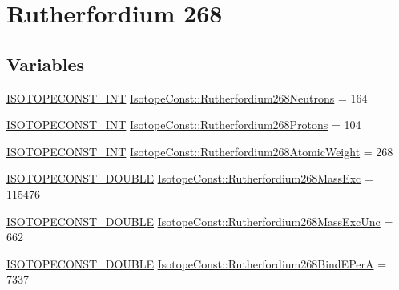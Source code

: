 \hypertarget{group___isotope_const-_rutherfordium-_rf268}{}\section{Rutherfordium 268}
\label{group___isotope_const-_rutherfordium-_rf268}
\subsection*{Variables}
\begin{DoxyCompactItemize}
\item 
\mbox{\hyperlink{group___isotope_const-_macros_ga5f18360b3e99483a35c32d789e62621c}{I\+S\+O\+T\+O\+P\+E\+C\+O\+N\+S\+T\+\_\+\+I\+NT}} \mbox{\hyperlink{group___isotope_const-_rutherfordium-_rf268_ga822ce4496854f3bbef0099f1af3bed20}{Isotope\+Const\+::\+Rutherfordium268\+Neutrons}} = 164
\item 
\mbox{\hyperlink{group___isotope_const-_macros_ga5f18360b3e99483a35c32d789e62621c}{I\+S\+O\+T\+O\+P\+E\+C\+O\+N\+S\+T\+\_\+\+I\+NT}} \mbox{\hyperlink{group___isotope_const-_rutherfordium-_rf268_ga9537b88927aee7d21b39dadd3f8a1919}{Isotope\+Const\+::\+Rutherfordium268\+Protons}} = 104
\item 
\mbox{\hyperlink{group___isotope_const-_macros_ga5f18360b3e99483a35c32d789e62621c}{I\+S\+O\+T\+O\+P\+E\+C\+O\+N\+S\+T\+\_\+\+I\+NT}} \mbox{\hyperlink{group___isotope_const-_rutherfordium-_rf268_gaf2c69f69dcfbe4c9998ef75584c32c88}{Isotope\+Const\+::\+Rutherfordium268\+Atomic\+Weight}} = 268
\item 
\mbox{\hyperlink{group___isotope_const-_macros_ga8f45a7272ce02c0b4c65c44636ed719a}{I\+S\+O\+T\+O\+P\+E\+C\+O\+N\+S\+T\+\_\+\+D\+O\+U\+B\+LE}} \mbox{\hyperlink{group___isotope_const-_rutherfordium-_rf268_gad30cd99b7f575f50e59961fb285950bb}{Isotope\+Const\+::\+Rutherfordium268\+Mass\+Exc}} = 115476
\item 
\mbox{\hyperlink{group___isotope_const-_macros_ga8f45a7272ce02c0b4c65c44636ed719a}{I\+S\+O\+T\+O\+P\+E\+C\+O\+N\+S\+T\+\_\+\+D\+O\+U\+B\+LE}} \mbox{\hyperlink{group___isotope_const-_rutherfordium-_rf268_ga505bb68196fee7dcd1377af6b60bf6f3}{Isotope\+Const\+::\+Rutherfordium268\+Mass\+Exc\+Unc}} = 662
\item 
\mbox{\hyperlink{group___isotope_const-_macros_ga8f45a7272ce02c0b4c65c44636ed719a}{I\+S\+O\+T\+O\+P\+E\+C\+O\+N\+S\+T\+\_\+\+D\+O\+U\+B\+LE}} \mbox{\hyperlink{group___isotope_const-_rutherfordium-_rf268_ga79ac29784f720f3ec55848d184e8caef}{Isotope\+Const\+::\+Rutherfordium268\+Bind\+E\+PerA}} = 7337

\end{DoxyCompactItemize}
